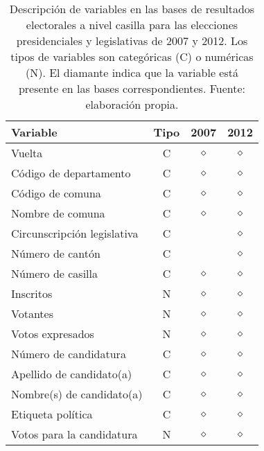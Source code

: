 \begin{table}
\centering
\begin{tabular}{l c c c}
\textbf{Variable} & \textbf{Tipo} & \textbf{2007} & \textbf{2012} \\
\hline 
Vuelta & C & $\diamond$ & $\diamond$  \\
Código de departamento & C & $\diamond$ & $\diamond$  \\
Código de comuna & C & $\diamond$ & $\diamond$  \\
Nombre de comuna & C & $\diamond$ & $\diamond$  \\
Circunscripción legislativa & C &  & $\diamond$  \\
Número de cantón & C &  & $\diamond$  \\
Número de casilla & C & $\diamond$ & $\diamond$  \\
Inscritos & N & $\diamond$ & $\diamond$  \\
Votantes & N & $\diamond$ & $\diamond$  \\
Votos expresados & N & $\diamond$ & $\diamond$  \\
Número de candidatura & C & $\diamond$ & $\diamond$  \\
Apellido de candidato(a) & C & $\diamond$ & $\diamond$  \\
Nombre(s) de candidato(a) & C & $\diamond$ & $\diamond$  \\
Etiqueta política & C & $\diamond$ & $\diamond$  \\
Votos para la candidatura  & N & $\diamond$ & $\diamond$  \\
\end{tabular}
\caption{Descripción de variables en las bases de resultados electorales a nivel casilla para las elecciones presidenciales y legislativas de 2007 y 2012. Los tipos de variables son categóricas (C) o numéricas (N). El diamante indica que la variable está presente en las bases correspondientes. Fuente: elaboración propia.}
\label{tbl:Bases_electorales}
\end{table}


